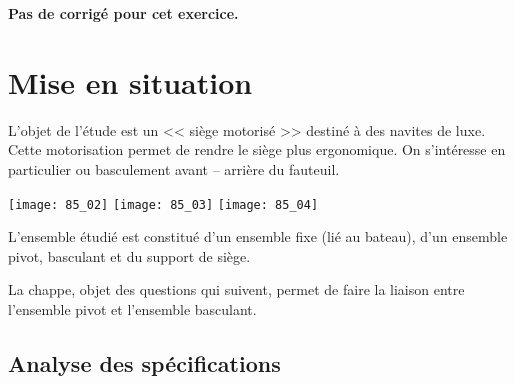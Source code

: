 \normaltrue
\correctionfalse


\setcounter{question}{0}



\ifcorrection
\else
\textbf{Pas de corrigé pour cet exercice.}
\fi

\section*{Mise en situation}
\ifprof
\else
\fi

L'objet de l'étude est un << siège motorisé >> destiné à des navites de luxe. Cette motorisation permet de rendre le siège plus ergonomique. On s'intéresse en particulier ou basculement avant -- arrière du fauteuil.

\begin{center}
\texttt{[image: 85\_02]}
\hspace{1cm}
\texttt{[image: 85\_03]}
\hspace{1cm}
\texttt{[image: 85\_04]}
\end{center}

L'ensemble étudié est constitué d'un ensemble fixe (lié au bateau), d'un ensemble pivot, basculant et du support de siège.

La chappe, objet des questions qui suivent, permet de faire la liaison entre l'ensemble pivot et l'ensemble basculant. 

\subsection*{Analyse des spécifications}






